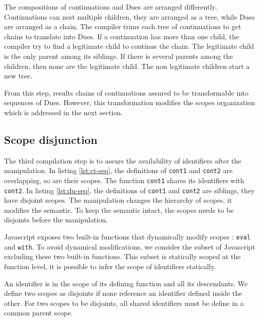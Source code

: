 The compositions of continuations and Dues are arranged differently.
Continuations can nest multiple children, they are arranged as a tree, while Dues are arranged as a chain.
The compiler trims each tree of continuations to get chains to translate into Dues.
If a continuation has more than one child, the compiler try to find a legitimate child to continue the chain.
The legitimate child is the only parent among its siblings.
If there is several parents among the children, then none are the legitimate child.
The non legitimate children start a new tree.

From this step, results chains of continuations assured to be transformable into sequences of Dues.
However, this transformation modifies the scopes organization which is addressed in the next section.

\subsection{Scope disjunction} \label{section:limits:disjunction}

The third compilation step is to assure the availability of identifiers after the manipulation.
In listing \ref{lst:ct-seq}, the definitions of \texttt{cont1} and \texttt{cont2} are overlapping, so are their scopes.
The function \texttt{cont1} shares its identifiers with \texttt{cont2}.
In listing \ref{lst:du-seq}, the definitions of \texttt{cont1} and \texttt{cont2} are siblings, they have disjoint scopes.
The manipulation changes the hierarchy of scopes, it modifies the semantic.
To keep the semantic intact, the scopes needs to be disjoints before the manipulation.

Javascript exposes two built-in functions that dynamically modify scopes : \texttt{eval} and \texttt{with}.
To avoid dynamical modifications, we consider the subset of Javascript excluding these two built-in functions.
This subset is statically scoped at the function level, it is possible to infer the scope of identifiers statically.

An identifier is in the scope of its defining function and all its descendants.
We define two scopes as disjoints if none reference an identifier defined inside the other.
For two scopes to be disjoints, all shared identifiers must be define in a common parent scope.

